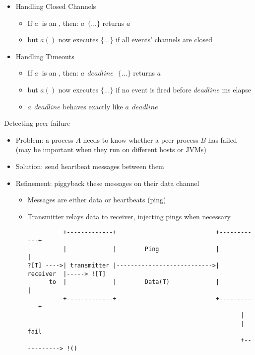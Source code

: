 \documentclass{concdistfoils}
\def\heading#1{\begin{cframed}[8.8in]{#1}\end{cframed}}
\begin{document}
\begin{slide}
\begin{itemize}
\item Handling Closed Channels 
\begin{itemize}
\item If $a~$ is an , then: $a~$$~\{ ...\}$ returns $a$ 
\item but $a()$ now executes $\{ ...\}$ if all events' channels are closed
\end{itemize}
\vfill
\item Handling Timeouts
\begin{itemize}
\item If $a~$ is an , then: 
      $a~$$~deadline~$$~~\{ ...\}$ returns $a$ 
\item but $a()$ now executes $\{ ...\}$ if no event is fired before $deadline$ ms elapse
\vfill
\item $a~$$~deadline$ behaves exactly like
      $a~$$~deadline~$$~~$
\end{itemize}
\end{itemize}
\end{slide}

\begin{slide}
\heading{Detecting peer failure}
\vfill
\begin{itemize}
\item Problem: a process $A$ needs to know whether a peer process $B$ has failed
\\ (may be important when they run on different hosts or JVMs)
\item Solution: send heartbeat messages between them
\item Refinement: piggyback these messages on their data channel
\vfill
\begin{itemize}
\item Messages are either data or heartbeats (ping) 
\item Transmitter relays data to receiver, injecting pings when necessary
\vfill
\begin{smaller}
\begin{verbatim}                                                                                            
          +-------------+                            +------------+
          |             |        Ping                |            |
?[T] ---->| transmitter |--------------------------->|  receiver  |-----> ![T] 
      to  |             |        Data(T)             |            |
          +-------------+                            +------------+
                                                            |    
                                                            |    fail
                                                            +-----------> !()
\end{verbatim}
\end{smaller}
\end{itemize}
\end{itemize}
\end{slide}
\end{document}
